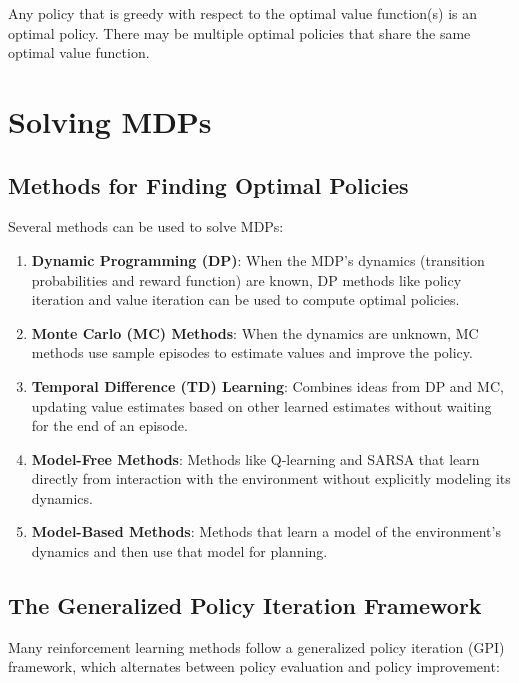 \documentclass[12pt,a4paper]{article}
\begin{document}
Any policy that is greedy with respect to the optimal value function(s) is an optimal policy. There may be multiple optimal policies that share the same optimal value function.

\section{Solving MDPs}

\subsection{Methods for Finding Optimal Policies}

Several methods can be used to solve MDPs:

\begin{enumerate}
    \item \textbf{Dynamic Programming (DP)}: When the MDP's dynamics (transition probabilities and reward function) are known, DP methods like policy iteration and value iteration can be used to compute optimal policies.
    
    \item \textbf{Monte Carlo (MC) Methods}: When the dynamics are unknown, MC methods use sample episodes to estimate values and improve the policy.
    
    \item \textbf{Temporal Difference (TD) Learning}: Combines ideas from DP and MC, updating value estimates based on other learned estimates without waiting for the end of an episode.
    
    \item \textbf{Model-Free Methods}: Methods like Q-learning and SARSA that learn directly from interaction with the environment without explicitly modeling its dynamics.
    
    \item \textbf{Model-Based Methods}: Methods that learn a model of the environment's dynamics and then use that model for planning.
\end{enumerate}

\subsection{The Generalized Policy Iteration Framework}

Many reinforcement learning methods follow a generalized policy iteration (GPI) framework, which alternates between policy evaluation and policy improvement:
\end{document}
